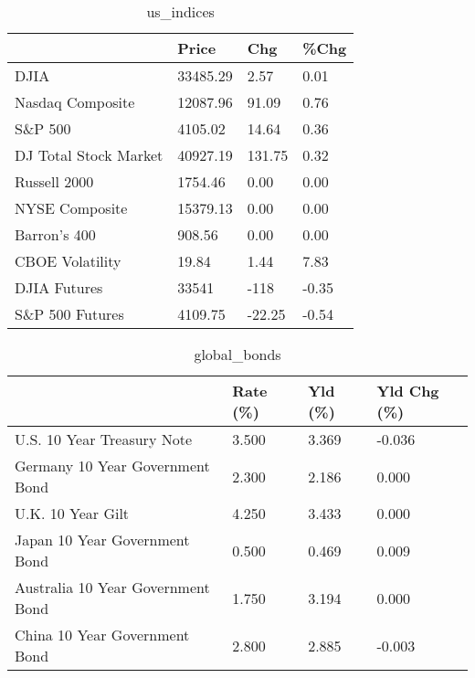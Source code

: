 \documentclass{article}%
\begin{document}
%


\begin{table}[htbp]%
\caption{us\_indices}%
\centering%
\begin{adjustbox}{width=1\textwidth}%
\begin{tabular}{llll}
\toprule
                      &    Price &    Chg &  \%Chg \\
\midrule
                 DJIA & 33485.29 &   2.57 &  0.01 \\
     Nasdaq Composite & 12087.96 &  91.09 &  0.76 \\
              S\&P 500 &  4105.02 &  14.64 &  0.36 \\
DJ Total Stock Market & 40927.19 & 131.75 &  0.32 \\
         Russell 2000 &  1754.46 &   0.00 &  0.00 \\
       NYSE Composite & 15379.13 &   0.00 &  0.00 \\
         Barron's 400 &   908.56 &   0.00 &  0.00 \\
      CBOE Volatility &    19.84 &   1.44 &  7.83 \\
         DJIA Futures &    33541 &   -118 & -0.35 \\
      S\&P 500 Futures &  4109.75 & -22.25 & -0.54 \\
\bottomrule
\end{tabular}
%
\end{adjustbox}%
\end{table}

%


\begin{table}[htbp]%
\caption{global\_bonds}%
\centering%
\begin{adjustbox}{width=1\textwidth}%
\begin{tabular}{llll}
\toprule
                                  & Rate (\%) & Yld (\%) & Yld Chg (\%) \\
\midrule
       U.S. 10 Year Treasury Note &    3.500 &   3.369 &      -0.036 \\
  Germany 10 Year Government Bond &    2.300 &   2.186 &       0.000 \\
                U.K. 10 Year Gilt &    4.250 &   3.433 &       0.000 \\
    Japan 10 Year Government Bond &    0.500 &   0.469 &       0.009 \\
Australia 10 Year Government Bond &    1.750 &   3.194 &       0.000 \\
    China 10 Year Government Bond &    2.800 &   2.885 &      -0.003 \\
\bottomrule
\end{tabular}
%
\end{adjustbox}%
\end{table}
\end{document}
